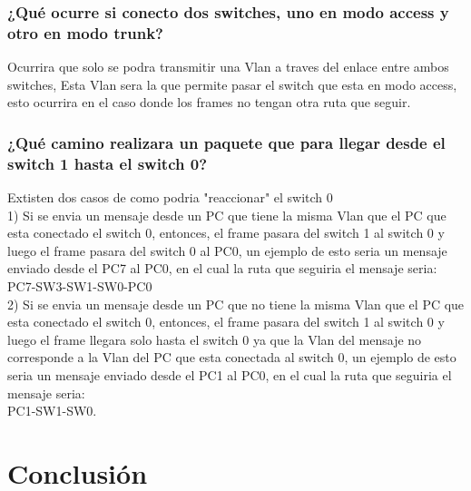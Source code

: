 \documentclass[spanish]{udpreport}
\begin{document}
\subsection{¿Qué ocurre si conecto dos switches, uno en modo access y otro en modo trunk?}
Ocurrira que solo se podra transmitir una Vlan a traves del enlace entre ambos switches, Esta Vlan sera la que permite pasar el switch que esta en modo access, esto ocurrira en el caso donde los frames no tengan otra ruta que seguir.\\

\subsection{¿Qué camino realizara un paquete que para llegar desde el switch 1 hasta el switch 0?}
Extisten dos casos de como podria "reaccionar" el switch 0\\
1) Si se envia un mensaje desde un PC que tiene la misma Vlan que el PC que esta conectado el switch 0, entonces, el frame pasara del switch 1 al switch 0 y luego el frame pasara del switch 0 al PC0, un ejemplo de esto seria un mensaje enviado desde el PC7 al PC0, en el cual la ruta que seguiria el mensaje seria:\\PC7-SW3-SW1-SW0-PC0\\

2) Si se envia un mensaje desde un PC que no tiene la misma Vlan que el PC que esta conectado el switch 0, entonces, el frame pasara del switch 1 al switch 0 y luego el frame llegara solo hasta el switch 0 ya que la Vlan del mensaje no corresponde a la Vlan del PC que esta conectada al switch 0, un ejemplo de esto seria un mensaje enviado desde el PC1 al PC0, en el cual la ruta que seguiria el mensaje seria:\\PC1-SW1-SW0.
\chapter{Conclusión}
\end{document}
